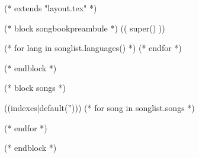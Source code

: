 

(* extends "layout.tex" *)

(* block songbookpreambule *)
   (( super() ))


   (* for lang in songlist.languages() *)
   (* endfor *)
   \usepackage[((lang))]{babel}

   \graphicspath{{((datadir))/img/}}
(* endblock *)

(* block songs *)

   \begin{songs}{((indexes|default('')))}
      (* for song in songlist.songs *)
      
      (* endfor *)
   \end{songs}
(* endblock *)
